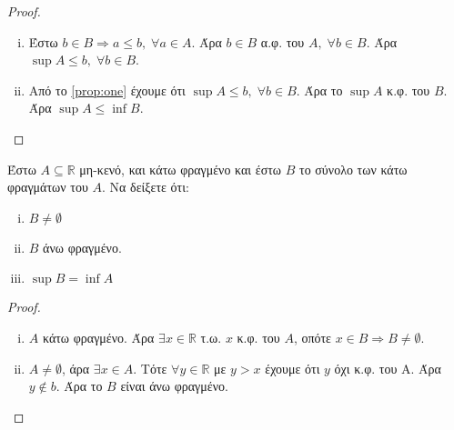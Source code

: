 \begin{multicols}{2}
\begin{enumerate}
            \begin{proof}
            \item {}
                \begin{enumerate}[i)]
                    \item \label{prop:one} Έστω $ b \in B \Rightarrow a \leq b, \; 
                        \forall a \in A $. 
                        Άρα $ b \in B $ α.φ. του $A, \; \forall b \in B$. Άρα 
                        $ \sup A \leq b, \; \forall b \in B $.

                    \item Από το \ref{prop:one} έχουμε ότι $ \sup A \leq b, \; \forall 
                        b \in B$. Άρα το $ \sup A $ κ.φ. του $B$. Άρα $ \sup A \leq 
                        \inf B$.
                \end{enumerate}
            \end{proof}

        \item \textcolor{Col1}{ Έστω $ A \subseteq \mathbb{R} $ μη-κενό, και κάτω φραγμένο και έστω 
                $ B $ το σύνολο των κάτω φραγμάτων του $A$. Να δείξετε ότι:
                \begin{enumerate}[i)]
                    \item $ B \neq \emptyset $
                    \item $B$ άνω φραγμένο.
                    \item $ \sup B = \inf A $
            \end{enumerate}}

            \begin{proof}
            \item {}
                \begin{enumerate}[i)]
                    \item $A$ κάτω φραγμένο. Άρα $ \exists x \in \mathbb{R} $ τ.ω. $x$ 
                        κ.φ. του $A$, οπότε $ x \in B \Rightarrow B \neq \emptyset $.

                    \item $ A \neq \emptyset $, άρα $ \exists x \in A $. Τότε $ \forall 
                        y \in \mathbb{R}$ με $ y>x $ έχουμε ότι $ y $ όχι κ.φ. του A. 
                        Άρα $ y \not\in b $. Άρα το $ B $ είναι άνω φραγμένο.


\end{enumerate}
\end{proof}
\end{enumerate}
\end{multicols}

